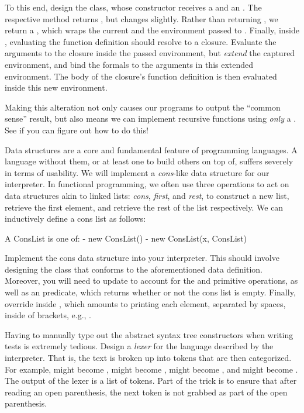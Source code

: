 To this end, design the  class, whose constructor receives a  and an . The respective  method returns , but  changes slightly. Rather than returning , we return a , which wraps the current  and the environment passed to . Finally, inside , evaluating the function definition should resolve to a closure. Evaluate the arguments to the closure inside the passed environment, but \textit{extend} the captured environment, and bind the formals to the arguments in this extended environment. The body of the closure's function definition is then evaluated inside this new environment. 

Making this alteration not only causes our programs to output the ``common sense'' result, but also means we can implement recursive functions using \textit{only} a . See if you can figure out how to do this!

Data structures are a core and fundamental feature of programming languages. A language without them, or at least one to build others on top of, suffers severely in terms of usability. We will implement a \emph{cons}-like data structure for our interpreter. In functional programming, we often use three operations to act on data structures akin to linked lists: \emph{cons}, \emph{first}, and \emph{rest}, to construct a new list, retrieve the first element, and retrieve the rest of the list respectively. We can inductively define a cons list as follows:

\begin{verbnobox}[\small]
A ConsList is one of:
 - new ConsList()
 - new ConsList(x, ConsList)
\end{verbnobox}

Implement the cons data structure into your interpreter. This should involve designing the  class that conforms to the aforementioned data definition. Moreover, you will need to update  to account for the  and  primitive operations, as well as an  predicate, which returns whether or not the cons list is empty. Finally, override  inside , which amounts to printing each element, separated by spaces, inside of brackets, e.g., \ttt{[$l_0, l_1, \ldots, l_{n-1}]$}.

Having to manually type out the abstract syntax tree constructors when writing tests is extremely tedious. Design a \emph{lexer} for the language described by the interpreter. That is, the text is broken up into tokens that are then categorized. For example, \ttt{\q{}(\q{}} might become ,  might become ,  might become , and  might become . The output of the lexer is a list of tokens. Part of the trick is to ensure that after reading an open parenthesis, the next token is not grabbed as part of the open parenthesis.

